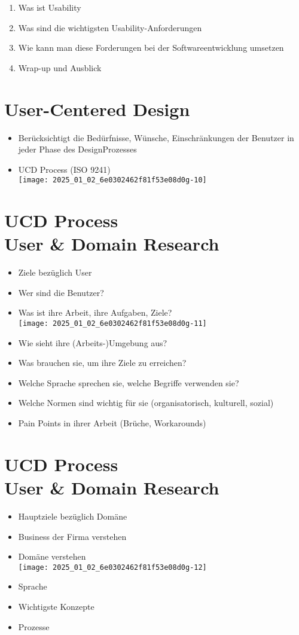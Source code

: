 \documentclass[10pt]{article}
\begin{document}
\begin{enumerate}
  \item Was ist Usability
  \item Was sind die wichtigsten Usability-Anforderungen
  \item Wie kann man diese Forderungen bei der Softwareentwicklung umsetzen
  \item Wrap-up und Ausblick
\end{enumerate}

\section*{User-Centered Design}
\begin{itemize}
  \item Berücksichtigt die Bedürfnisse, Wünsche, Einschränkungen der Benutzer in jeder Phase des DesignProzesses
  \item UCD Process (ISO 9241)\\
\texttt{[image: 2025\_01\_02\_6e0302462f81f53e08d0g-10]}
\end{itemize}

\section*{UCD Process \\
 User \& Domain Research}
\begin{itemize}
  \item Ziele bezüglich User
  \item Wer sind die Benutzer?
  \item Was ist ihre Arbeit, ihre Aufgaben, Ziele?\\
\texttt{[image: 2025\_01\_02\_6e0302462f81f53e08d0g-11]}
  \item Wie sieht ihre (Arbeits-)Umgebung aus?
  \item Was brauchen sie, um ihre Ziele zu erreichen?
  \item Welche Sprache sprechen sie, welche Begriffe verwenden sie?
  \item Welche Normen sind wichtig für sie (organisatorisch, kulturell, sozial)
  \item Pain Points in ihrer Arbeit (Brüche, Workarounds)
\end{itemize}

\section*{UCD Process \\
 User \& Domain Research}
\begin{itemize}
  \item Hauptziele bezüglich Domäne
  \item Business der Firma verstehen
  \item Domäne verstehen\\
\texttt{[image: 2025\_01\_02\_6e0302462f81f53e08d0g-12]}
  \item Sprache
  \item Wichtigste Konzepte
  \item Prozesse
\end{itemize}
\end{document}
